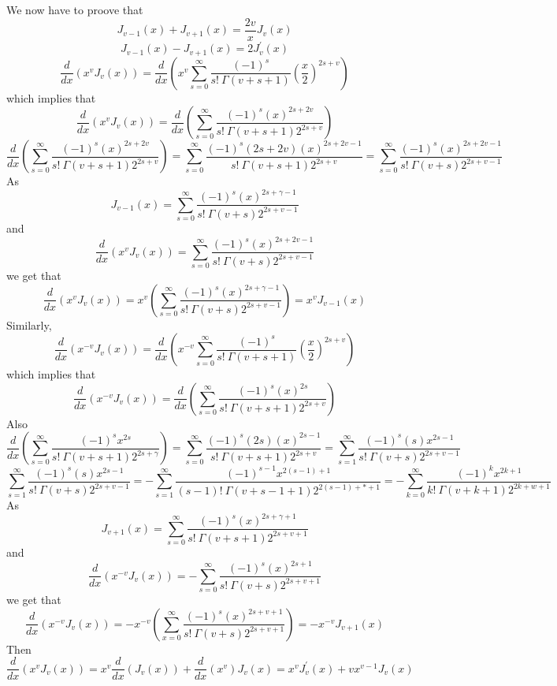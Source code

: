 We now have to proove that
$$J_{v-1}(x)+J_{v+1}(x)=\frac{2 v}{x} J_{v}(x)$$
$$J_{v-1}(x)-J_{v+1}(x)=2 J_{v}^{\prime}(x)$$
$$\frac{d}{d x}\left(x^{v} J_{v}(x)\right)=\frac{d}{d x}\left(x^{v} \sum_{s=0}^{\infty} \frac{(-1)^{s}}{s ! \  \Gamma(v+s+1)}\left(\frac{x}{2}\right)^{2 s+v}\right)$$
which implies that
$$
\frac{d}{d x}\left(x^{v} J_{v}(x)\right)=\frac{d}{d x}\left(\sum_{s=0}^{\infty} \frac{(-1)^{s}(x)^{2 s+2 v}}{s ! \  \Gamma(v+s+1) 2^{2 s+v}}\right)
$$
$$
\frac{d}{d x}\left(\sum_{s=0}^{\infty} \frac{(-1)^{s}(x)^{2 s+2 v}}{s ! \  \Gamma(v+s+1) 2^{2 s+v}}\right)=\sum_{s=0}^{\infty} \frac{(-1)^{s}(2 s+2 v)(x)^{2 s+2 v-1}}{s ! \  \Gamma(v+s+1) 2^{2 s+v}}=\sum_{s=0}^{\infty} \frac{(-1)^{s}(x)^{2 s+2 v-1}}{s ! \  \Gamma(v+s) 2^{2 s+v-1}}
$$
As 
$$J_{v-1}(x)=\sum_{s=0}^{\infty} \frac{(-1)^{s}(x)^{2 s+\gamma-1}}{s ! \  \Gamma(v+s) 2^{2 s+v-1}}$$
and
$$
\frac{d}{d x}\left(x^{v} J_{v}(x)\right)=\sum_{s=0}^{\infty} \frac{(-1)^{s}(x)^{2 s+2 v-1}}{s ! \  \Gamma(v+s) 2^{2 s+v-1}}
$$
we get that
$$
\frac{d}{d x}\left(x^{v} J_{v}(x)\right)=x^{v}\left(\sum_{s=0}^{\infty} \frac{(-1)^{s}(x)^{2 s+\gamma-1}}{s ! \  \Gamma(v+s) 2^{2 s+v-1}}\right)=x^{v} J_{v-1}(x)
$$
Similarly, 
$$
\frac{d}{d x}\left(x^{-v} J_{v}(x)\right)=\frac{d}{d x}\left(x^{-v} \sum_{s=0}^{\infty} \frac{(-1)^{s}}{s ! \  \Gamma(v+s+1)}\left(\frac{x}{2}\right)^{2 s+v}\right)
$$
which implies that
$$
\frac{d}{d x}\left(x^{-v} J_{v}(x)\right)=\frac{d}{d x}\left(\sum_{s=0}^{\infty} \frac{(-1)^{s}(x)^{2 s}}{s ! \  \Gamma(v+s+1) 2^{2 s+v}}\right)
$$
Also
$$
\frac{d}{d x}\left(\sum_{s=0}^{\infty} \frac{(-1)^{s} x^{2 s}}{s ! \  \Gamma(v+s+1) 2^{2 s+\gamma}}\right)=\sum_{s=0}^{\infty} \frac{(-1)^{s}(2 s)(x)^{2 s-1}}{s ! \  \Gamma(v+s+1) 2^{2 s+v}}=\sum_{s=1}^{\infty} \frac{(-1)^{s}(s) x^{2 s-1}}{s ! \  \Gamma(v+s) 2^{2 s+v-1}}
$$
$$
\sum_{s=1}^{\infty} \frac{(-1)^{s}(s) x^{2 s-1}}{s ! \  \Gamma(v+s) 2^{2 s+v-1}}=-\sum_{s=1}^{\infty} \frac{(-1)^{s-1} x^{2(s-1)+1}}{(s-1) ! \  \Gamma(v+s-1+1) 2^{2(s-1)+*+1}}=-\sum_{k=0}^{\infty} \frac{(-1)^{k} x^{2 k+1}}{k ! \  \Gamma(v+k+1) 2^{2 k+w+1}}
$$
As
$$
J_{v+1}(x)=\sum_{s=0}^{\infty} \frac{(-1)^{s}(x)^{2 s+\gamma+1}}{s ! \  \Gamma(v+s+1) 2^{2 s+v+1}}
$$
and
$$
\frac{d}{d x}\left(x^{-v} J_{v}(x)\right)=-\sum_{s=0}^{\infty} \frac{(-1)^{s}(x)^{2 s+1}}{s ! \  \Gamma(v+s) 2^{2 s+v+1}}
$$
we get that
$$
\frac{d}{d x}\left(x^{-v} J_{v}(x)\right)=-x^{-v}\left(\sum_{x=0}^{\infty} \frac{(-1)^{s}(x)^{2 s+v+1}}{s ! \  \Gamma(v+s) 2^{2 s+v+1}}\right)=-x^{-v} J_{v+1}(x)
$$
Then
$$
\frac{d}{d x}\left(x^{v} J_{v}(x)\right)=x^{v} \frac{d}{d x}\left(J_{v}(x)\right)+\frac{d}{d x}\left(x^{v}\right) J_{v}(x)=x^{v} J_{v}^{\prime}(x)+v x^{v-1} J_{v}(x)
$$
